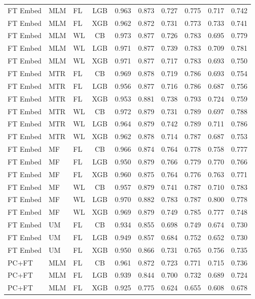 \documentclass[9pt,a4paper]{article}
\begin{document}
\begin{scriptsize}
\begin{longtable}{lllcrrrrrr}
FT Embed & MLM & FL & LGB & 0.963 & 0.873 & 0.727 & 0.775 & 0.717 & 0.742 \\
FT Embed & MLM & FL & XGB & 0.962 & 0.872 & 0.731 & 0.773 & 0.733 & 0.741 \\
FT Embed & MLM & WL & CB  & 0.973 & 0.877 & 0.726 & 0.783 & 0.695 & 0.779 \\
FT Embed & MLM & WL & LGB & 0.971 & 0.877 & 0.739 & 0.783 & 0.709 & 0.781 \\
FT Embed & MLM & WL & XGB & 0.971 & 0.877 & 0.717 & 0.783 & 0.693 & 0.750 \\
FT Embed & MTR & FL & CB  & 0.969 & 0.878 & 0.719 & 0.786 & 0.693 & 0.754 \\
FT Embed & MTR & FL & LGB & 0.956 & 0.877 & 0.716 & 0.786 & 0.687 & 0.756 \\
FT Embed & MTR & FL & XGB & 0.953 & 0.881 & 0.738 & 0.793 & 0.724 & 0.759 \\
FT Embed & MTR & WL & CB  & 0.972 & 0.879 & 0.731 & 0.789 & 0.697 & 0.788 \\
FT Embed & MTR & WL & LGB & 0.964 & 0.879 & 0.742 & 0.789 & 0.711 & 0.786 \\
FT Embed & MTR & WL & XGB & 0.962 & 0.878 & 0.714 & 0.787 & 0.687 & 0.753 \\
FT Embed & MF  & FL & CB  & 0.966 & 0.874 & 0.764 & 0.778 & 0.758 & 0.777 \\
FT Embed & MF  & FL & LGB & 0.950 & 0.879 & 0.766 & 0.779 & 0.770 & 0.766 \\
FT Embed & MF  & FL & XGB & 0.960 & 0.875 & 0.764 & 0.776 & 0.763 & 0.771 \\
FT Embed & MF  & WL & CB  & 0.957 & 0.879 & 0.741 & 0.787 & 0.710 & 0.783 \\
FT Embed & MF  & WL & LGB & 0.970 & 0.882 & 0.783 & 0.787 & 0.800 & 0.778 \\
FT Embed & MF  & WL & XGB & 0.969 & 0.879 & 0.749 & 0.785 & 0.777 & 0.748 \\
FT Embed & UM  & FL & CB  & 0.934 & 0.855 & 0.698 & 0.749 & 0.674 & 0.730 \\
FT Embed & UM  & FL & LGB & 0.949 & 0.857 & 0.684 & 0.752 & 0.652 & 0.730 \\
FT Embed & UM  & FL & XGB & 0.950 & 0.866 & 0.731 & 0.765 & 0.756 & 0.735 \\
\midrule
PC+FT & MLM & FL & CB  & 0.961 & 0.872 & 0.723 & 0.771 & 0.715 & 0.736 \\
PC+FT & MLM & FL & LGB & 0.939 & 0.844 & 0.700 & 0.732 & 0.689 & 0.724 \\
PC+FT & MLM & FL & XGB & 0.925 & 0.775 & 0.624 & 0.655 & 0.608 & 0.678 \\

\end{longtable}
\end{scriptsize}
\end{document}
